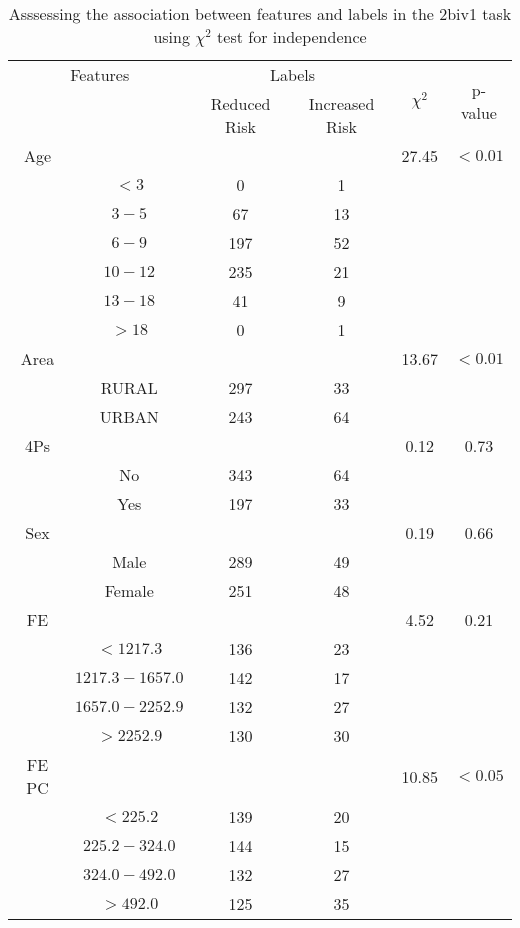 \begin{table}[!htb]
\centering
\caption{Asssessing the association between features and labels in the 2biv1 task using $\chi^2$ test for independence}
\label{tab:chitest_2biv1}
\begin{tabular}{c c | c c| c | c}
\hline
\multicolumn{2}{c|}{Features}& \multicolumn{2}{c|}{Labels}& \multirow{2}{*}{$\chi^2$} & \multirow{2}{*}{p-value}\\ 
& & Reduced Risk & Increased Risk & & \\ 
\hline
Age &  &  & & 27.45 & $< 0.01$ \\ 
& $< 3$ & 0 & 1& & \\ 
& $3-5$ & 67 & 13& & \\ 
& $6-9$ & 197 & 52& & \\ 
& $10-12$ & 235 & 21& & \\ 
& $13-18$ & 41 & 9& & \\ 
& $> 18$ & 0 & 1& & \\ 
\hline 
Area &  &  & & 13.67 & $< 0.01$ \\ 
& RURAL & 297 & 33& & \\ 
& URBAN & 243 & 64& & \\ 
\hline 
4Ps &  &  & & 0.12 & 0.73 \\ 
& No & 343 & 64& & \\ 
& Yes & 197 & 33& & \\ 
\hline 
Sex &  &  & & 0.19 & 0.66 \\ 
& Male & 289 & 49& & \\ 
& Female & 251 & 48& & \\ 
\hline 
FE &  &  & & 4.52 & 0.21 \\ 
& $< 1217.3$ & 136 & 23& & \\ 
& $1217.3-1657.0$ & 142 & 17& & \\ 
& $1657.0-2252.9$ & 132 & 27& & \\ 
& $> 2252.9$ & 130 & 30& & \\ 
\hline 
FE PC &  &  & & 10.85 & $< 0.05$ \\ 
& $< 225.2$ & 139 & 20& & \\ 
& $225.2-324.0$ & 144 & 15& & \\ 
& $324.0-492.0$ & 132 & 27& & \\ 
& $> 492.0$ & 125 & 35& & \\ 
\hline 
\end{tabular}
\end{table}
